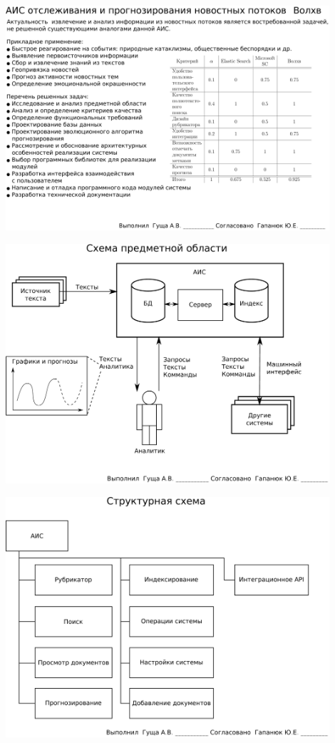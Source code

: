 \documentclass[russian,utf8, a1paper, emptystyle]{eskdgraph}
\begin{document}
\begin{ESKDdrawing}
\includegraphics[width=0.90\textwidth]{lists/list1}
\end{ESKDdrawing}

\begin{ESKDdrawing}
\includegraphics[width=0.90\textwidth]{lists/list2}
\end{ESKDdrawing}

\begin{ESKDdrawing}
\includegraphics[width=0.90\textwidth]{lists/list3}
\end{ESKDdrawing}
\end{document}
